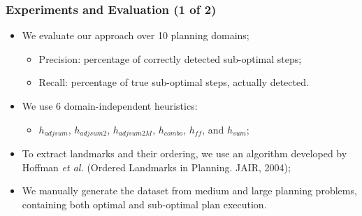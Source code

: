 \documentclass{beamer}
\begin{document}
\begin{frame}[c]\frametitle{Experiments and Evaluation (1 of 2)}
   	\begin{itemize}
   		\item We evaluate our approach over 10 planning domains;
		\begin{itemize}
			\item Precision: percentage of correctly detected sub-optimal steps;
			\item Recall: percentage of true sub-optimal steps, actually detected. 
		\end{itemize}
		\item We use 6 domain-independent heuristics: 
		\begin{itemize}
			\item $h_{adjsum}$, $h_{adjsum2}$, $h_{adjsum2M}$, $h_{combo}$, $h_{ff}$, and $h_{sum}$;
		\end{itemize}
		\item To extract landmarks and their ordering, we use an algorithm developed by Hoffman \emph{et al.} {\footnotesize (Ordered Landmarks in Planning. JAIR, 2004)};
		\item We manually generate the dataset from medium and large planning problems, containing both optimal and sub-optimal plan execution.
	\end{itemize}
\end{frame}
\end{document}
